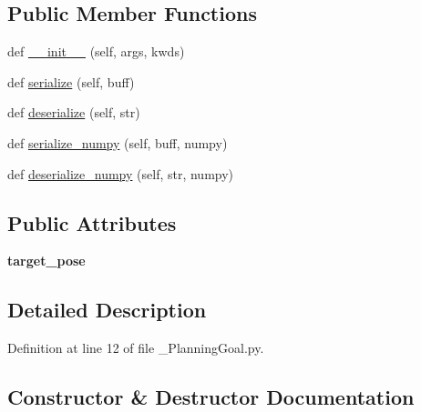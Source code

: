 \subsection*{Public Member Functions}
\begin{DoxyCompactItemize}
\item 
def \hyperlink{classexp__assignment2_1_1msg_1_1__PlanningGoal_1_1PlanningGoal_ac2fbe9757c95756d450eb29b3b7fed8b}{\+\_\+\+\_\+init\+\_\+\+\_\+} (self, args, kwds)
\item 
def \hyperlink{classexp__assignment2_1_1msg_1_1__PlanningGoal_1_1PlanningGoal_a1bcb2dd555433aea2e0bc0516ccdee31}{serialize} (self, buff)
\item 
def \hyperlink{classexp__assignment2_1_1msg_1_1__PlanningGoal_1_1PlanningGoal_a17a942c105c3bee5f7f2df0170e35976}{deserialize} (self, str)
\item 
def \hyperlink{classexp__assignment2_1_1msg_1_1__PlanningGoal_1_1PlanningGoal_ad294ffb00ad456b67f92aa552399f234}{serialize\+\_\+numpy} (self, buff, numpy)
\item 
def \hyperlink{classexp__assignment2_1_1msg_1_1__PlanningGoal_1_1PlanningGoal_aa8c3650660b828320c0b9eb2664ae380}{deserialize\+\_\+numpy} (self, str, numpy)
\end{DoxyCompactItemize}
\subsection*{Public Attributes}
\begin{DoxyCompactItemize}
\item 
\mbox{\label{classexp__assignment2_1_1msg_1_1__PlanningGoal_1_1PlanningGoal_afbbc124f864ac54c5a861c2d803d6386}} 
{\bfseries target\+\_\+pose}
\end{DoxyCompactItemize}


\subsection{Detailed Description}


Definition at line 12 of file \+\_\+\+Planning\+Goal.\+py.



\subsection{Constructor \& Destructor Documentation}
\mbox{\label{classexp__assignment2_1_1msg_1_1__PlanningGoal_1_1PlanningGoal_ac2fbe9757c95756d450eb29b3b7fed8b}} 
